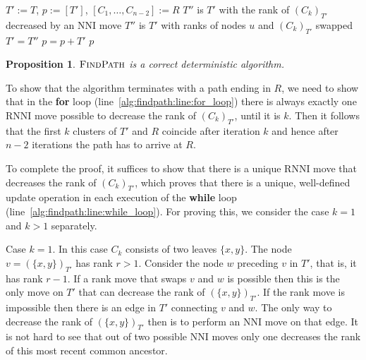 \documentclass[11pt]{amsart}
\newtheorem{proposition}{Proposition}
\newcommand{\rnni}{\mathrm{RNNI}}
\newcommand{\findpath}{\textsc{FindPath}}
\newcommand{\rank}{\mathrm{rank}}
\newcommand{\nni}{\mathrm{NNI}}
\begin{document}
\begin{algorithm}[H]
\caption{$\findpath$($T,R$)}
\begin{algorithmic}[1]
\STATE $T' := T$, $p := [T']$, $[C_1, \ldots, C_{n-2}] := R$
\label{alg:findpath:line:for_loop}
	\WHILE {$\rank((C_k)_{T'})>k$}
	\label{alg:findpath:line:while_loop}
			\STATE $T''$ is $T'$ with the rank of $(C_k)_{T'}$ decreased by an $\nni$ move
		\ELSE
			\STATE $T''$ is $T'$ with ranks of nodes $u$ and $(C_k)_{T'}$ swapped
		\ENDIF
		\STATE $T' = T''$
		\STATE $p = p+T'$
	\ENDWHILE
\ENDFOR
\RETURN $p$
\end{algorithmic}
\end{algorithm}

\begin{proposition}
$\findpath$ is a correct deterministic algorithm.
\end{proposition}

\proof
To show that the algorithm terminates with a path ending in $R$, we need to show that in the \textbf{for} loop (line~\ref{alg:findpath:line:for_loop}) there is always exactly one $\rnni$ move possible to decrease the rank of $(C_k)_{T'}$, until it is $k$.
Then it follows that the first $k$ clusters of $T'$ and $R$ coincide after iteration $k$ and hence after $n-2$ iterations the path has to arrive at $R$.

To complete the proof, it suffices to show that there is a unique $\rnni$ move that decreases the rank of $(C_k)_{T'}$, which proves that there is a unique, well-defined update operation in each execution of the \textbf{while} loop (line~\ref{alg:findpath:line:while_loop}).
For proving this, we consider the case $k = 1$ and $k>1$ separately.

Case $k = 1$.
In this case $C_k$ consists of two leaves $\{x, y\}$.
The node $v = (\{x, y\})_{T'}$ has rank $r > 1$.
Consider the node $w$ preceding $v$ in $T'$, that is, it has rank $r - 1$.
If a rank move that swaps $v$ and $w$ is possible then this is the only move on $T'$ that can decrease the rank of $(\{x, y\})_{T'}$.
If the rank move is impossible then there is an edge in $T'$ connecting $v$ and $w$.
The only way to decrease the rank of $(\{x, y\})_{T'}$ then is to perform an $\nni$ move on that edge.
It is not hard to see that out of two possible $\nni$ moves only one decreases the rank of this most recent common ancestor.
\end{document}
